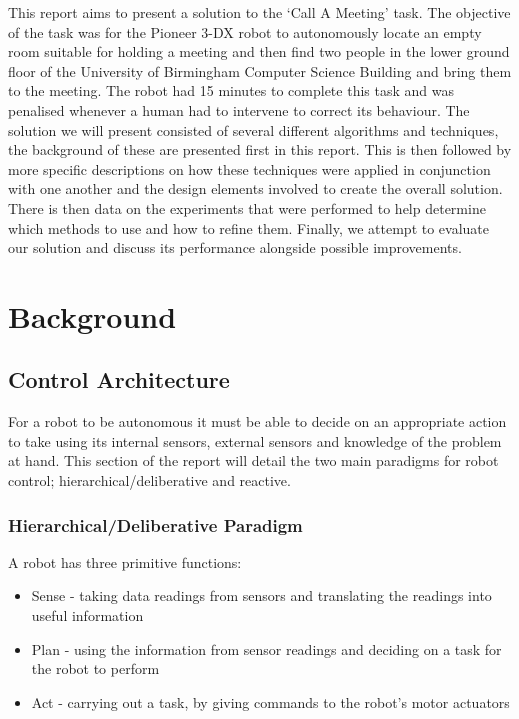 This report aims to present a solution to the ‘Call A Meeting’ task. The objective of the task was for the Pioneer 3-DX robot to autonomously locate an empty room suitable for holding a meeting and then find two people in the lower ground floor of the University of Birmingham Computer Science Building and bring them to the meeting. The robot had 15 minutes to complete this task and was penalised whenever a human had to intervene to correct its behaviour. The solution we will present consisted of several different algorithms and techniques, the background of these are presented first in this report. This is then followed by more specific descriptions on how these techniques were applied in conjunction with one another and the design elements involved to create the overall solution. There is then data on the experiments that were performed to help determine which methods to use and how to refine them. Finally, we attempt to evaluate our solution  and discuss its performance alongside possible improvements.

\section{Background}

\subsection{Control Architecture}

For a robot to be autonomous it must be able to decide on an appropriate action to take using its internal sensors, external sensors and knowledge of the problem at hand. This section of the report will detail the two main paradigms for robot control; hierarchical/deliberative and reactive.

\subsubsection{Hierarchical/Deliberative Paradigm}

A robot has three primitive functions:

\begin{itemize}
\item Sense - taking data readings from sensors and translating the readings into useful information
\item Plan - using the information from sensor readings and deciding on a task for the robot to perform
\item Act - carrying out a task, by giving commands to the robot’s motor actuators
\end{itemize}

